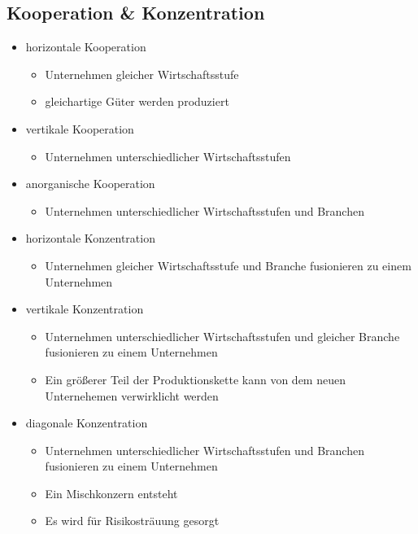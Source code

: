 
\subsection{Kooperation \& Konzentration}

\begin{itemize}
	\item horizontale Kooperation
		\begin{itemize}
			\item Unternehmen gleicher Wirtschaftsstufe
			\item gleichartige Güter werden produziert
		\end{itemize}
	\item vertikale Kooperation
		\begin{itemize}
			\item Unternehmen unterschiedlicher Wirtschaftsstufen
		\end{itemize}
	\item anorganische Kooperation
		\begin{itemize}
			\item Unternehmen unterschiedlicher Wirtschaftsstufen und Branchen
		\end{itemize}
\end{itemize}

\begin{itemize}
	\item horizontale Konzentration
		\begin{itemize}
			\item Unternehmen gleicher Wirtschaftsstufe und Branche fusionieren zu einem Unternehmen
		\end{itemize}
	\item vertikale Konzentration
		\begin{itemize}
			\item Unternehmen unterschiedlicher Wirtschaftsstufen und gleicher Branche fusionieren zu einem Unternehmen
			\item Ein größerer Teil der Produktionskette kann von dem neuen Unternehemen verwirklicht werden
		\end{itemize}
	\item diagonale Konzentration
		\begin{itemize}
			\item Unternehmen unterschiedlicher Wirtschaftsstufen und Branchen fusionieren zu einem Unternehmen
			\item Ein Mischkonzern entsteht
			\item Es wird für Risikosträuung gesorgt
		\end{itemize}
\end{itemize}


